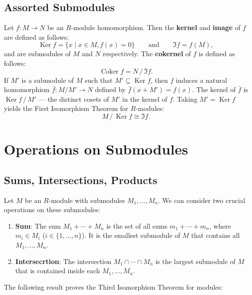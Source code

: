 \documentclass[11pt]{article}
\newcommand{\Ker}{\operatorname{Ker}}
\newcommand{\Coker}{\operatorname{Coker}}
\begin{document}

\subsection{Assorted Submodules}

Let $f : M \to N$ be an $R$-module homomorphism. Then the \textbf{kernel} and \textbf{image} of $f$ are defined as follows:
\[
	\Ker f = \{ x \mid x \in M, f(x) = 0 \} \qquad \text{and} \qquad \Im f = f(M),
\]
and are submodules of $M$ and $N$ respectively. The \textbf{cokernel} of $f$ is defined as follows:
\[
	\Coker f = N \,/\, \Im f.
\]
If $M'$ is a submodule of $M$ such that $M' \subseteq \Ker f$, then $f$ induces a natural homomorphism $\bar{f} : M / M' \to N$ defined by $\bar{f}(x + M') = f(x)$. The kernel of $\bar{f}$ is $\Ker f \,/\, M'$ --- the distinct cosets of $M'$ in the kernel of $f$. Taking $M' = \Ker f$ yields the First Isomorphism Theorem for $R$-modules:
\[
	M \,/\, \Ker f \cong \Im f.
\]


\section{Operations on Submodules}


\subsection{Sums, Intersections, Products}

Let $M$ be an $R$-module with submodules $M_{1}, \ldots, M_{n}$. We can consider two crucial operations on these submodules:
\begin{enumerate}
	\item \textbf{Sum}: The sum $M_{1} + \cdots + M_{n}$ is the set of all sums $m_{1} + \cdots + m_{n}$, where $m_{i} \in M_{i}$ ($i \in \{ 1, \ldots, n \}$). It is the smallest submodule of $M$ that contains all $M_{1}, \ldots, M_{n}$.
	\item \textbf{Intersecrtion}: The intersection $M_{1} \cap \cdots \cap M_{n}$ is the largest submodule of $M$ that is contained inside each $M_{1}, \ldots, M_{n}$.
\end{enumerate}

The following result proves the Third Isomorphism Theorem for modules:
\end{document}
